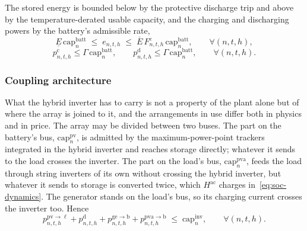 \documentclass[11pt,a4paper]{article}
\theoremstyle{plain}
\theoremstyle{definition}
\begin{document}
The stored energy is bounded below by the protective discharge trip and above by the
temperature-derated usable capacity, and the charging and discharging powers by the
battery's admissible rate,
\begin{equation}
  \underline{E}\,\mathrm{cap}^{\mathrm{batt}}_n
  \;\leq\; e_{n,t,h} \;\leq\;
  \overline{E}\, F^{e}_{n,t,h}\,\mathrm{cap}^{\mathrm{batt}}_n,
  \qquad \forall (n,t,h),
  \label{eq:soc-bounds}
\end{equation}
\begin{equation}
  p^{\mathrm{c}}_{n,t,h} \le \Gamma\,\mathrm{cap}^{\mathrm{batt}}_n,
  \qquad
  p^{\mathrm{d}}_{n,t,h} \le \Gamma\,\mathrm{cap}^{\mathrm{batt}}_n,
  \qquad \forall (n,t,h).
  \label{eq:batt-rate}
\end{equation}

\subsubsection{Coupling architecture}
\label{sec:coupling}

What the hybrid inverter has to carry is not a property of the plant alone but of where the
array is joined to it, and the arrangements in use differ both in physics and in price. The
array may be divided between two buses. The part on the battery's bus,
$\mathrm{cap}^{\mathrm{pv}}_n$, is admitted by the maximum-power-point trackers integrated
in the hybrid inverter and reaches storage directly; whatever it sends to the load crosses
the inverter. The part on the load's bus, $\mathrm{cap}^{\mathrm{pva}}_n$, feeds the load
through string inverters of its own without crossing the hybrid inverter, but whatever it
sends to storage is converted twice, which $H^{\mathrm{ac}}$ charges
in~\eqref{eq:soc-dynamics}. The generator stands on the load's bus, so its charging current
crosses the inverter too. Hence
\begin{equation}
  p^{\mathrm{pv}\to\ell}_{n,t,h} + p^{\mathrm{d}}_{n,t,h}
  + p^{\mathrm{ge}\to\mathrm{b}}_{n,t,h} + p^{\mathrm{pva}\to\mathrm{b}}_{n,t,h}
  \;\leq\; \mathrm{cap}^{\mathrm{inv}}_n,
  \qquad \forall (n,t,h).
  \label{eq:inv-bounds}
\end{equation}
\end{document}
